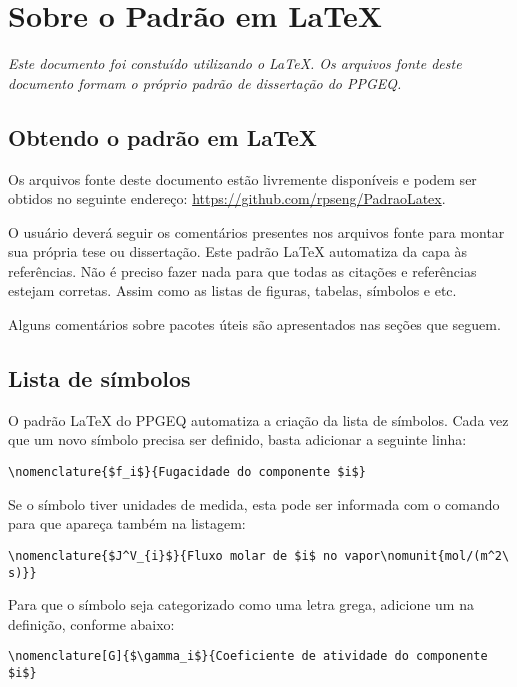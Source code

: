 %
%
%
\chapter{Sobre o Padrão em \LaTeX{}}

\emph{Este documento foi constuído utilizando o \LaTeX{}.
Os arquivos fonte deste documento formam o próprio padrão de dissertação
do PPGEQ.}

\section{Obtendo o padrão em \LaTeX{}}

Os arquivos fonte deste documento estão livremente disponíveis e podem ser obtidos no seguinte endereço:
\href{https://github.com/rpseng/PadraoLatex}{https://github.com/rpseng/PadraoLatex}.

O usuário deverá seguir os comentários presentes nos arquivos fonte para montar
sua própria tese ou dissertação.
Este padrão \LaTeX{} automatiza da capa às referências.
Não é preciso fazer nada para que todas as citações e referências estejam corretas.
Assim como as listas de figuras, tabelas, símbolos e etc.

Alguns comentários sobre pacotes úteis são apresentados nas seções que seguem.

\section{Lista de símbolos}

O padrão \LaTeX{} do PPGEQ automatiza a criação da lista de símbolos.
Cada vez que um novo símbolo precisa ser definido, basta adicionar a seguinte linha:
\begin{lstlisting}[numbers=none]
\nomenclature{$f_i$}{Fugacidade do componente $i$}
\end{lstlisting}

Se o símbolo tiver unidades de medida, esta pode ser informada
com o comando  para que apareça também na listagem:
\begin{lstlisting}[numbers=none]
\nomenclature{$J^V_{i}$}{Fluxo molar de $i$ no vapor\nomunit{mol/(m^2\ s)}}
\end{lstlisting}


Para que o símbolo seja categorizado como uma letra grega, adicione um  na definição,
conforme abaixo:
\begin{lstlisting}[numbers=none]
\nomenclature[G]{$\gamma_i$}{Coeficiente de atividade do componente $i$}
\end{lstlisting}

